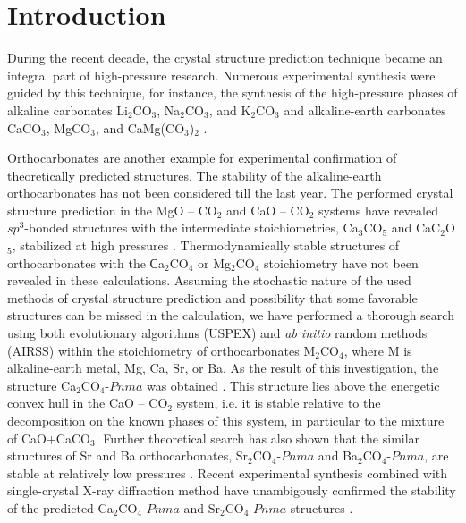 \documentclass[a4paperm]{article}
\begin{document}
\section*{Introduction}

During the recent decade, the crystal structure prediction technique became an integral part of high-pressure research. 
Numerous experimental synthesis were guided by this technique, for instance, the synthesis of the high-pressure phases of alkaline carbonates Li$_2$CO$_3$, Na$_2$CO$_3$, and K$_2$CO$_3$ \cite{gavr2016, gavr2019_alk, grzechnik2003}  and alkaline-earth carbonates CaCO$_3$, MgCO$_3$, and CaMg(CO$_3$)$_2$ \cite{oganov2006, pickard2015, gavr2017_aragII, smith2018, solomatova2017_fedol, binck2020_dol, merlini2017_dol}.
 
Orthocarbonates are another example for experimental confirmation of theoretically predicted structures.
The stability of the alkaline-earth orthocarbonates has not been considered till the last year.
The performed crystal structure prediction in the MgO -- CO$_2$ and CaO -- CO$_2$ systems have revealed $sp^3$-bonded structures with the intermediate stoichiometries,  Ca$_3$CO$_5$ and CaC$_2$O$_5$, stabilized at high pressures \cite{yao2018}. 
Thermodynamically stable structures of orthocarbonates with the Сa$_2$CO$_4$ or Mg$_2$CO$_4$ stoichiometry  have not been revealed in these calculations.
Assuming the stochastic nature of the used methods of crystal structure prediction and possibility that some favorable structures can be missed in the calculation, we have performed a thorough search using both evolutionary algorithms (USPEX) and {\it ab initio} random methods (AIRSS) within the stoichiometry of orthocarbonates M$_2$CO$_4$, where M is alkaline-earth metal, Mg, Ca, Sr, or Ba.
As the result of this investigation, the structure Ca$_2$CO$_4$-$Pnma$ was obtained \cite{sagatova2020_ortho}.
This structure lies above the energetic convex hull in the CaO -- CO$_2$ system, i.e. it is stable relative to the decomposition on the known phases of this system, in particular to the mixture of CaO+CaCO$_3$.
Further theoretical search has also shown that the similar structures of Sr and Ba orthocarbonates, Sr$_2$CO$_4$-$Pnma$ and Ba$_2$CO$_4$-$Pnma$, are stable at relatively low pressures \cite{gavr2020_htxrd}. 
Recent experimental synthesis combined with single-crystal X-ray diffraction method have unambigously confirmed the stability of the predicted Ca$_2$CO$_4$-$Pnma$ and Sr$_2$CO$_4$-$Pnma$ structures \cite{laniel2021_sr2co4,binck2021_ca2co4}.
\end{document}
